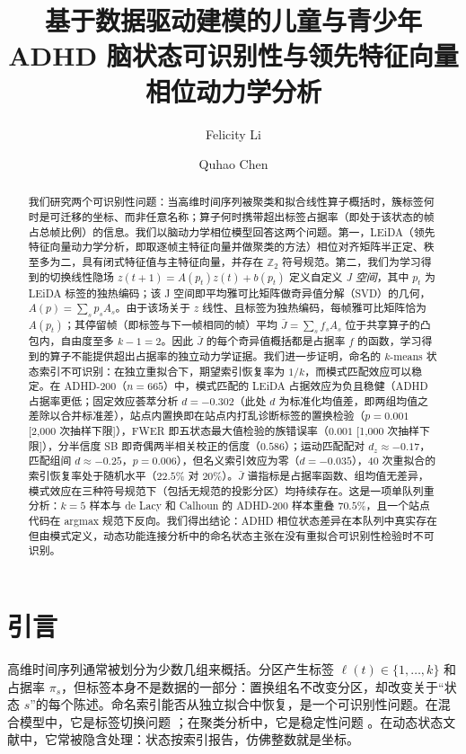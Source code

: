 \documentclass[11pt]{ctexart}
\title{基于数据驱动建模的儿童与青少年 ADHD 脑状态可识别性与领先特征向量相位动力学分析}
\author{Felicity Li \and Quhao Chen}
\date{}
\theoremstyle{definition}
\begin{document}
\maketitle

\begin{abstract}
我们研究两个可识别性问题：当高维时间序列被聚类和拟合线性算子概括时，簇标签何时是可迁移的坐标、而非任意名称；算子何时携带超出标签占据率（即处于该状态的帧占总帧比例）的信息。我们以脑动力学相位模型回答这两个问题。第一，LEiDA（领先特征向量动力学分析，即取逐帧主特征向量并做聚类的方法）相位对齐矩阵半正定、秩至多为二，具有闭式特征值与主特征向量，并存在 $\mathbb{Z}_2$ 符号规范。第二，我们为学习得到的切换线性隐场 $z(t+1)=A(p_t)z(t)+b(p_t)$ 定义自定义 \emph{J 空间}，其中 $p_t$ 为 LEiDA 标签的独热编码；该 J 空间即平均雅可比矩阵做奇异值分解（SVD）的几何，$A(p)=\sum_s p_sA_s$。由于该场关于 $z$ 线性、且标签为独热编码，每帧雅可比矩阵恰为 $A(p_t)$；其停留帧（即标签与下一帧相同的帧）平均 $\bar J=\sum_s f_sA_s$ 位于共享算子的凸包内，自由度至多 $k-1=2$。因此 $\bar J$ 的每个奇异值概括都是占据率 $f$ 的函数，学习得到的算子不能提供超出占据率的独立动力学证据。我们进一步证明，命名的 $k$-means 状态索引不可识别：在独立重拟合下，期望索引恢复率为 $1/k$，而模式匹配效应可以稳定。在 ADHD-200（$n=665$）中，模式匹配的 LEiDA 占据效应为负且稳健（ADHD 占据率更低；固定效应荟萃分析 $d=-0.302$（此处 $d$ 为标准化均值差，即两组均值之差除以合并标准差），站点内置换即在站点内打乱诊断标签的置换检验（$p=0.001$ [2,000 次抽样下限]），FWER 即五状态最大值检验的族错误率（$0.001$ [1,000 次抽样下限]），分半信度 SB 即奇偶两半相关校正的信度（$0.586$）；运动匹配配对 $d_z\approx-0.17$，匹配组间 $d\approx-0.25$，$p=0.006$），但名义索引效应为零（$d=-0.035$），40 次重拟合的索引恢复率处于随机水平（$22.5\%$ 对 $20\%$）。$\bar J$ 谱指标是占据率函数、组均值无差异，模式效应在三种符号规范下（包括无规范的投影分区）均持续存在。这是一项单队列重分析：$k=5$ 样本与 de Lacy 和 Calhoun 的 ADHD-200 样本重叠 $70.5\%$，且一个站点代码在 argmax 规范下反向。我们得出结论：ADHD 相位状态差异在本队列中真实存在但由模式定义，动态功能连接分析中的命名状态主张在没有重拟合可识别性检验时不可识别。
\end{abstract}

\section{引言}

高维时间序列通常被划分为少数几组来概括。分区产生标签 $\ell(t)\in\{1,\dots,k\}$ 和占据率 $\pi_s$，但标签本身不是数据的一部分：置换组名不改变分区，却改变关于“状态 $s$”的每个陈述。命名索引能否从独立拟合中恢复，是一个可识别性问题。在混合模型中，它是标签切换问题 \cite{Stephens2000,Jasra2005}；在聚类分析中，它是稳定性问题 \cite{Hennig2007,vonLuxburg2010}。在动态状态文献中，它常被隐含处理：状态按索引报告，仿佛整数就是坐标。
\end{document}
